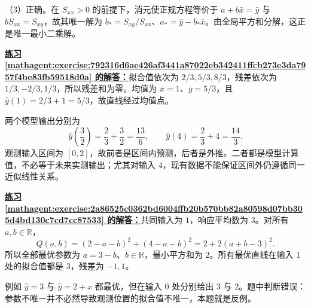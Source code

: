 \documentclass[UTF8,fontset=fandol,11pt]{ctexart}
\begin{document}
（3）正确。在 $S_{xx}>0$ 的前提下，消元使正规方程等价于 $a+b\bar{x}=\bar{y}$ 与 $bS_{xx}=S_{xy}$，故其唯一解为 $b_*=S_{xy}/S_{xx}$、$a_*=\bar{y}-b_*\bar{x}$。由全局平方和分解，这正是唯一最小二乘解。\par
\par\noindent\textbf{\hyperref[mathagent:exercise:792316d6ae426af3441a87022eb342411ffcb273e3da7957f4be83fb59518d0a]{练习 \ref*{mathagent:exercise:792316d6ae426af3441a87022eb342411ffcb273e3da7957f4be83fb59518d0a} 的解答：}}拟合值依次为 $2/3,5/3,8/3$，残差依次为 $1/3,-2/3,1/3$，所以残差和为零。均值为 $\bar{x}=1$、$\bar{y}=5/3$，且 $\hat{y}(1)=2/3+1=5/3$，故直线经过均值点。

两个模型输出分别为
\[
\hat{y}\left(\frac32\right)=\frac23+\frac32=\frac{13}{6},\qquad
\hat{y}(4)=\frac23+4=\frac{14}{3}.
\]
观测输入区间为 $[0,2]$，故前者是区间内预测，后者是外推。二者都是模型计算值，不必等于未来实测输出；尤其对输入 $4$，现有数据不能保证区间外仍遵循同一近似线性关系。\par
\par\noindent\textbf{\hyperref[mathagent:exercise:2a86525c0362bd6004ffb20b570bb82a80598d07bb305d4bd130c7cd7cc87533]{练习 \ref*{mathagent:exercise:2a86525c0362bd6004ffb20b570bb82a80598d07bb305d4bd130c7cd7cc87533} 的解答：}}共同输入为 $1$，响应平均数为 $3$。对所有 $a,b\in\mathbb{R}$，
\[
Q(a,b)=(2-a-b)^2+(4-a-b)^2=2+2(a+b-3)^2.
\]
所以全部最优参数为 $a=3-b$、$b\in\mathbb{R}$，最小平方和为 $2$。所有最优直线在输入 $1$ 处的拟合值都是 $3$，残差为 $-1,1$。

例如 $\hat{y}=3$ 与 $\hat{y}=2+x$ 都最优，但在输入 $0$ 处分别给出 $3$ 与 $2$。题中判断错误：参数不唯一并不必然导致观测位置的拟合值不唯一，本题就是反例。\par
\end{document}
